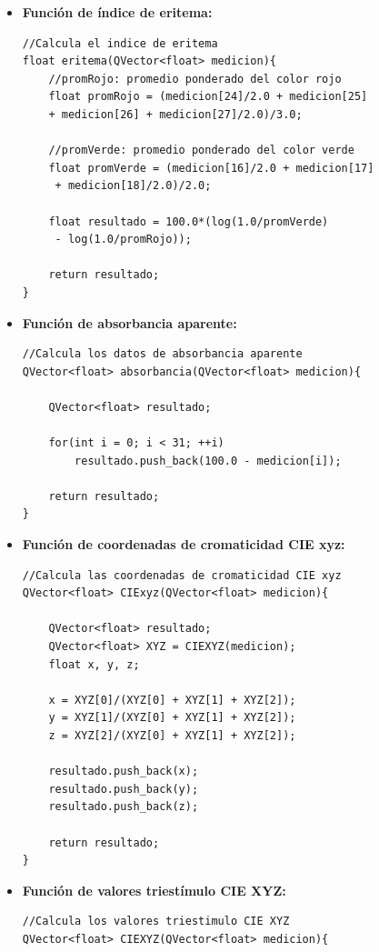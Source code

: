 	\begin{itemize}
	
	\item \textbf{Funci\'{o}n de \'{i}ndice de eritema:}	
		\begin{lstlisting}
//Calcula el indice de eritema
float eritema(QVector<float> medicion){
    //promRojo: promedio ponderado del color rojo
    float promRojo = (medicion[24]/2.0 + medicion[25]
    + medicion[26] + medicion[27]/2.0)/3.0;

    //promVerde: promedio ponderado del color verde
    float promVerde = (medicion[16]/2.0 + medicion[17]
     + medicion[18]/2.0)/2.0;

    float resultado = 100.0*(log(1.0/promVerde)
     - log(1.0/promRojo));

    return resultado;
}
	\end{lstlisting}
	
\newpage	
	
		\item \textbf{Funci\'{o}n de absorbancia aparente:}
			\begin{lstlisting}
//Calcula los datos de absorbancia aparente
QVector<float> absorbancia(QVector<float> medicion){

	QVector<float> resultado;
	
   	for(int i = 0; i < 31; ++i)
		resultado.push_back(100.0 - medicion[i]);

    return resultado;
}
			\end{lstlisting}
			
		\item \textbf{Funci\'{o}n de coordenadas de cromaticidad CIE xyz:}		
			\begin{lstlisting}
//Calcula las coordenadas de cromaticidad CIE xyz
QVector<float> CIExyz(QVector<float> medicion){
    
    QVector<float> resultado;
    QVector<float> XYZ = CIEXYZ(medicion);
    float x, y, z;

    x = XYZ[0]/(XYZ[0] + XYZ[1] + XYZ[2]);
    y = XYZ[1]/(XYZ[0] + XYZ[1] + XYZ[2]);
    z = XYZ[2]/(XYZ[0] + XYZ[1] + XYZ[2]);

    resultado.push_back(x);
    resultado.push_back(y);
    resultado.push_back(z);

    return resultado;
}
			\end{lstlisting}
			
\newpage
		
		\item \textbf{Funci\'{o}n de valores triest\'{i}mulo CIE XYZ:}
			\begin{lstlisting}
//Calcula los valores triestimulo CIE XYZ
QVector<float> CIEXYZ(QVector<float> medicion){
    

\end{lstlisting}
\end{itemize}
